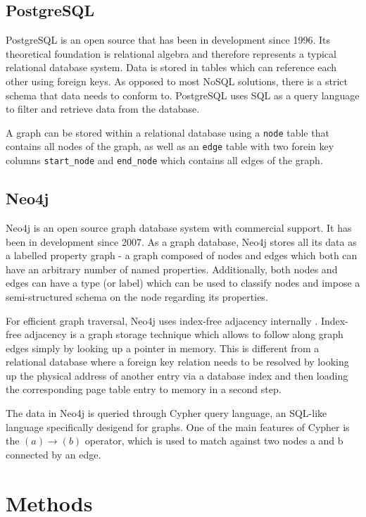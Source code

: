 \documentclass[11pt, a4paper,oneside,chapterprefix=false]{scrbook}
\begin{document}
\section{PostgreSQL}
PostgreSQL \cite{postgres} is an open source that has been in development since 1996.
Its theoretical foundation is relational algebra \cite{relationalalgebra} and therefore represents a typical relational database system.
Data is stored in tables which can reference each other using foreign keys.
As opposed to most NoSQL solutions, there is a strict schema that data needs to conform to.
PostgreSQL uses SQL as a query language to filter and retrieve data from the database.

A graph can be stored within a relational database using a \lstinline{node} table that contains all nodes of the graph, as well as an \lstinline{edge} table with two forein key columns \lstinline{start_node} and \lstinline{end_node} which contains all edges of the graph.

\section{Neo4j}
Neo4j \cite{neo4j} is an open source graph database system with commercial support.
It has been in development since 2007.
As a graph database, Neo4j stores all its data as a labelled property graph - a graph composed of nodes and edges which both can have an arbitrary number of named properties.
Additionally, both nodes and edges can have a type (or label) which can be used to classify nodes and impose a semi-structured schema on the node regarding its properties.

For efficient graph traversal, Neo4j uses index-free adjacency internally \cite{neo4jinaction:chapter11}.
Index-free adjacency is a graph storage technique which allows to follow along graph edges simply by looking up a pointer in memory.
This is different from a relational database where a foreign key relation needs to be resolved by looking up the physical address of another entry via a database index and then loading the corresponding page table entry to memory in a second step.

The data in Neo4j is queried through Cypher query language, an SQL-like language specifically desigend for graphs.
One of the main features of Cypher is the $(a)\rightarrow(b)$ operator, which is used to match against two nodes a and b connected by an edge.

\chapter{Methods} \label{chp:methods}
\end{document}
